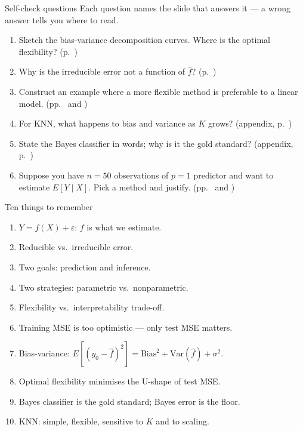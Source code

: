 \documentclass[aspectratio=169,11pt]{beamer}
\begin{document}
\begin{frame}{Self-check questions}
  Each question names the slide that answers it --- a wrong answer tells you
  where to read.
  \begin{enumerate}
    \item Sketch the bias-variance decomposition curves. Where is the
          optimal flexibility? (p.~\pageref{frm:bvcurves})
    \item Why is the irreducible error not a function of $\hat f$? (p.~\pageref{frm:irred})
    \item Construct an example where a more flexible method is
          preferable to a linear model. (pp.~\pageref{frm:roughfit} and \pageref{frm:lessflex})
    \item For KNN, what happens to bias and variance as $K$ grows? (appendix, p.~\pageref{frm:chooseK})
    \item State the Bayes classifier in words; why is it the gold
          standard? (appendix, p.~\pageref{frm:bayes})
    \item Suppose you have $n = 50$ observations of $p = 1$ predictor
          and want to estimate $E[Y \mid X]$. Pick a method and
          justify. (pp.~\pageref{frm:tradeoffmap} and \pageref{frm:lessflex})
  \end{enumerate}
\end{frame}

\begin{frame}{Ten things to remember}
  \begin{enumerate}
    \item $Y = f(X) + \varepsilon$: $f$ is what we estimate.
    \item Reducible vs.\ irreducible error.
    \item Two goals: prediction and inference.
    \item Two strategies: parametric vs.\ nonparametric.
    \item Flexibility vs.\ interpretability trade-off.
    \item Training MSE is too optimistic --- only test MSE matters.
    \item Bias-variance: $E[(y_0 - \hat f)^2] = \mathrm{Bias}^2 +
          \mathrm{Var}(\hat f) + \sigma^2$.
    \item Optimal flexibility minimises the U-shape of test MSE.
    \item Bayes classifier is the gold standard; Bayes error is the
          floor.
    \item KNN: simple, flexible, sensitive to $K$ and to scaling.
  \end{enumerate}
\end{frame}
\end{document}
